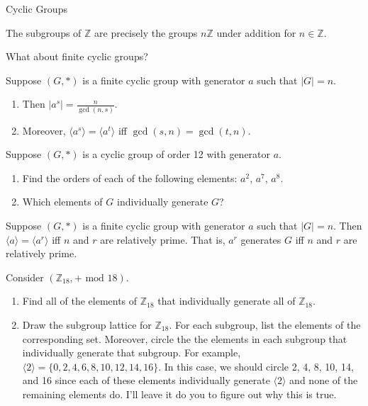 \begin{section}{Cyclic Groups}
\begin{corollary}\label{cor:subgroups_of_Z}
The subgroups of $\mathbb{Z}$ are precisely the groups $n\mathbb{Z}$ under addition for $n\in \mathbb{Z}$.
\end{corollary}

What about finite cyclic groups?

\begin{theorem}
Suppose $(G,*)$ is a finite cyclic group with generator $a$ such that $|G|=n$.  
\begin{enumerate}[label=\rm{(\alph*)}]
\item Then $\displaystyle |a^s|=\frac{n}{\gcd(n,s)}$.
\item Moreover, $\langle a^s\rangle=\langle a^t\rangle$ iff $\gcd(s,n)=\gcd(t,n)$.
\end{enumerate}
\end{theorem}

\begin{exercise}
Suppose $(G,*)$ is a cyclic group of order 12 with generator $a$. 
\begin{enumerate}[label=\rm{(\alph*)}]
\item Find the orders of each of the following elements: $a^2$, $a^7$, $a^8$.
\item Which elements of $G$ individually generate $G$?
\end{enumerate}
\end{exercise}

\begin{corollary}
Suppose $(G,*)$ is a finite cyclic group with generator $a$ such that $|G|=n$. Then $\langle a\rangle=\langle a^r\rangle$ iff $n$ and $r$ are relatively prime. That is, $a^r$ generates $G$ iff $n$ and $r$ are relatively prime.
\end{corollary}

\begin{exercise}
Consider $(\mathbb{Z}_{18},+\text{ mod }18)$.
\begin{enumerate}[label=\rm{(\alph*)}]
\item Find all of the elements of $\mathbb{Z}_{18}$ that individually generate all of $\mathbb{Z}_{18}$.
\item Draw the subgroup lattice for $\mathbb{Z}_{18}$. For each subgroup, list the elements of the corresponding set.  Moreover, circle the the elements in each subgroup that individually generate that subgroup.  For example, $\langle 2\rangle=\{0,2,4,6,8,10,12,14,16\}$. In this case, we should circle 2, 4, 8, 10, 14, and 16 since each of these elements individually generate $\langle 2\rangle$ and none of the remaining elements do.  I'll leave it do you to figure out why this is true.
\end{enumerate}
\end{exercise}


\end{section}
